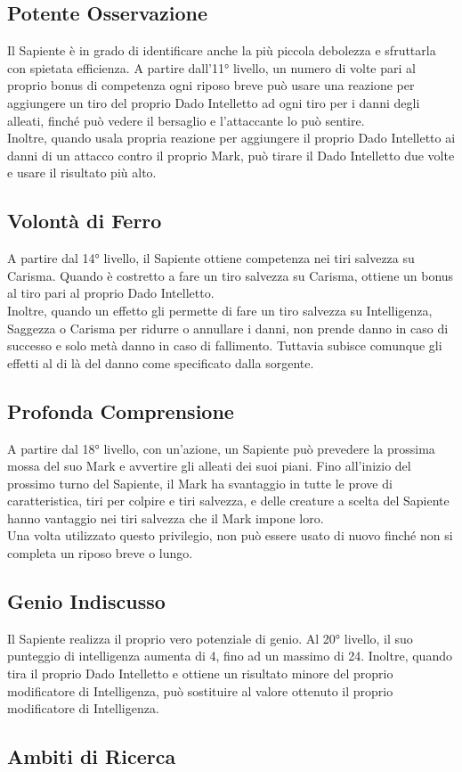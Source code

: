 \subsection{Potente Osservazione}
Il Sapiente è in grado di identificare anche la più piccola debolezza e sfruttarla con spietata efficienza. A partire dall'11° livello, un numero di volte pari al proprio bonus di competenza ogni riposo breve può usare una reazione per aggiungere un tiro del proprio Dado Intelletto ad ogni tiro per i danni degli alleati, finché può vedere il bersaglio e l'attaccante lo può sentire.\\
Inoltre, quando usala propria reazione per aggiungere il proprio Dado Intelletto ai danni di un attacco contro il proprio Mark, può tirare il Dado Intelletto due volte e usare il risultato più alto.

\subsection{Volontà di Ferro}
A partire dal 14° livello, il Sapiente ottiene competenza nei tiri salvezza su Carisma. Quando è costretto a fare un tiro salvezza su Carisma, ottiene un bonus al tiro pari al proprio Dado Intelletto.\\
Inoltre, quando un effetto gli permette di fare un tiro salvezza su Intelligenza, Saggezza o Carisma per ridurre o annullare i danni, non prende danno in caso di successo e solo metà danno in caso di fallimento. Tuttavia subisce comunque gli effetti al di là del danno come specificato dalla sorgente.

\subsection{Profonda Comprensione}
A partire dal 18° livello, con un'azione, un Sapiente può prevedere la prossima mossa del suo Mark e avvertire gli alleati dei suoi piani. Fino all'inizio del prossimo turno del Sapiente, il Mark ha svantaggio in tutte le prove di caratteristica, tiri per colpire e tiri salvezza, e delle creature a scelta del Sapiente hanno vantaggio nei tiri salvezza che il Mark impone loro.\\
Una volta utilizzato questo privilegio, non può essere usato di nuovo finché non si completa un riposo breve o lungo.

\subsection{Genio Indiscusso}
Il Sapiente realizza il proprio vero potenziale di genio. Al 20° livello, il suo punteggio di intelligenza aumenta di 4, fino ad un massimo di 24. Inoltre, quando tira il proprio Dado Intelletto e ottiene un risultato minore del proprio modificatore di Intelligenza, può sostituire al valore ottenuto il proprio modificatore di Intelligenza.

\subsection{Ambiti di Ricerca}